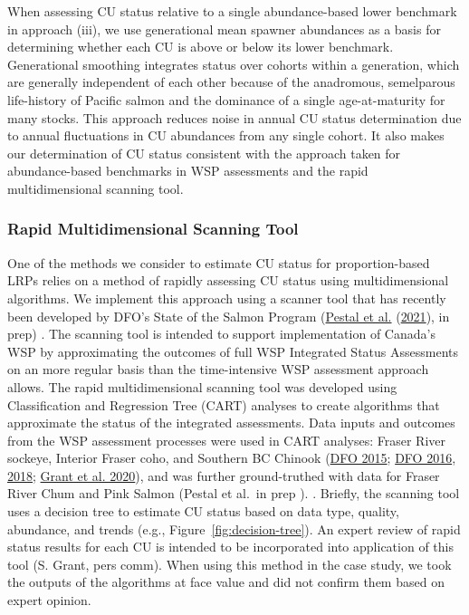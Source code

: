 \documentclass[11pt]{book}
\begin{document}
When assessing CU status relative to a single abundance-based lower benchmark in approach (iii), we use generational mean spawner abundances as a basis for determining whether each CU is above or below its lower benchmark. Generational smoothing integrates status over cohorts within a generation, which are generally independent of each other because of the anadromous, semelparous life-history of Pacific salmon and the dominance of a single age-at-maturity for many stocks. This approach reduces noise in annual CU status determination due to annual fluctuations in CU abundances from any single cohort. It also makes our determination of CU status consistent with the approach taken for abundance-based benchmarks in WSP assessments and the rapid multidimensional scanning tool.

\hypertarget{rapidToolMethods}{%
\subsubsection{Rapid Multidimensional Scanning Tool}\label{rapidToolMethods}}

One of the methods we consider to estimate CU status for proportion-based LRPs relies on a method of rapidly assessing CU status using multidimensional algorithms. We implement this approach using a scanner tool that has recently been developed by DFO's State of the Salmon Program (\protect\hyperlink{ref-pestalAlgorithmsRapidStatus2021}{Pestal et al.} (\protect\hyperlink{ref-pestalAlgorithmsRapidStatus2021}{2021}), in prep) . The scanning tool is intended to support implementation of Canada's WSP by approximating the outcomes of full WSP Integrated Status Assessments on an more regular basis than the time-intensive WSP assessment approach allows. The rapid multidimensional scanning tool was developed using Classification and Regression Tree (CART) analyses to create algorithms that approximate the status of the integrated assessments. Data inputs and outcomes from the WSP assessment processes were used in CART analyses: Fraser River sockeye, Interior Fraser coho, and Southern BC Chinook (\protect\hyperlink{ref-dfoWildSalmonPolicy2015}{DFO 2015}; \protect\hyperlink{ref-dfoIntegratedBiologicalStatus2016}{DFO 2016}, \protect\hyperlink{ref-dfo2017FraserSockeye2018}{2018}; \protect\hyperlink{ref-grant2017FraserSockeye2020}{Grant et al. 2020}), and was further ground-truthed with data for Fraser River Chum and Pink Salmon (Pestal et al.~in prep ). . Briefly, the scanning tool uses a decision tree to estimate CU status based on data type, quality, abundance, and trends (e.g., Figure~\ref{fig:decision-tree}). An expert review of rapid status results for each CU is intended to be incorporated into application of this tool (S. Grant, pers comm). When using this method in the case study, we took the outputs of the algorithms at face value and did not confirm them based on expert opinion.
\end{document}
